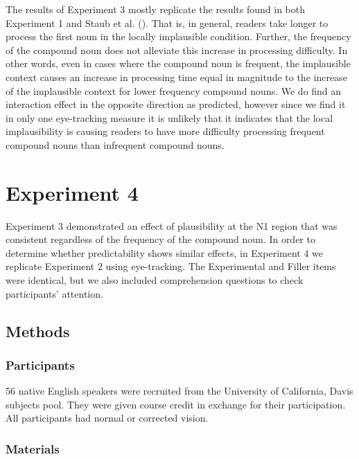 \documentclass[
  12pt,
  letterpaper,
]{scrreport}
\begin{document}
The results of Experiment 3 mostly replicate the results found in both
Experiment 1 and Staub et al.
(). That is, in
general, readers take longer to process the first noun in the locally
implausible condition. Further, the frequency of the compound noun does
not alleviate this increase in processing difficulty. In other words,
even in cases where the compound noun is frequent, the implausible
context causes an increase in processing time equal in magnitude to the
increase of the implausible context for lower frequency compound nouns.
We do find an interaction effect in the opposite direction as predicted,
however since we find it in only one eye-tracking measure it is unlikely
that it indicates that the local implausibility is causing readers to
have more difficulty processing frequent compound nouns than infrequent
compound nouns.

\section{Experiment 4}\label{experiment-4}

Experiment 3 demonstrated an effect of plausibility at the N1 region
that was consistent regardless of the frequency of the compound noun. In
order to determine whether predictability shows similar effects, in
Experiment 4 we replicate Experiment 2 using eye-tracking. The
Experimental and Filler items were identical, but we also included
comprehension questions to check participants' attention.

\subsection{Methods}\label{methods-3}

\subsubsection{Participants}\label{participants-3}

56 native English speakers were recruited from the University of
California, Davis subjects pool. They were given course credit in
exchange for their participation. All participants had normal or
corrected vision.

\subsubsection{Materials}\label{materials-1}
\end{document}
